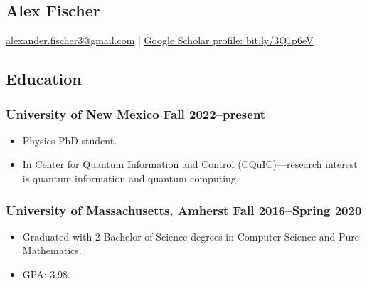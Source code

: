 \documentclass{article}
\begin{document}
	\begin{center}
		\section*{Alex Fischer}
			\href{mailto:alexander.fischer3@gmail.com}{alexander.fischer3@gmail.com} | \href{https://scholar.google.com/citations?user=CfhWaI4AAAAJ&hl=en}{Google Scholar profile: bit.ly/3Q1p6eV}
    \end{center}
	\subsection*{Education}
		\subsubsection*{University of New Mexico \hfill \normalfont \normalsize Fall 2022--present}
			\begin{itemize}[noitemsep,leftmargin=40pt]
				\item Physics PhD student.
				\item In Center for Quantum Information and Control (CQuIC)---research interest is quantum information and quantum computing.
			\end{itemize}
		\subsubsection*{University of Massachusetts, Amherst \hfill \normalfont \normalsize Fall 2016--Spring 2020}
			\begin{itemize}[noitemsep,leftmargin=40pt]
				\item Graduated with 2 Bachelor of Science degrees in Computer Science and Pure Mathematics.
				\item GPA: 3.98.
			\end{itemize}
\end{document}
